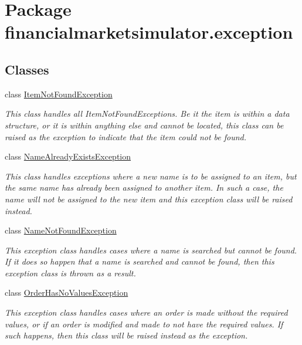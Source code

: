 \hypertarget{namespacefinancialmarketsimulator_1_1exception}{\section{Package financialmarketsimulator.\+exception}
\label{namespacefinancialmarketsimulator_1_1exception}
}
\subsection*{Classes}
\begin{DoxyCompactItemize}
\item 
class \hyperlink{classfinancialmarketsimulator_1_1exception_1_1_item_not_found_exception}{Item\+Not\+Found\+Exception}
\begin{DoxyCompactList}\small\item\em This class handles all Item\+Not\+Found\+Exceptions. Be it the item is within a data structure, or it is within anything else and cannot be located, this class can be raised as the exception to indicate that the item could not be found. \end{DoxyCompactList}\item 
class \hyperlink{classfinancialmarketsimulator_1_1exception_1_1_name_already_exists_exception}{Name\+Already\+Exists\+Exception}
\begin{DoxyCompactList}\small\item\em This class handles exceptions where a new name is to be assigned to an item, but the same name has already been assigned to another item. In such a case, the name will not be assigned to the new item and this exception class will be raised instead. \end{DoxyCompactList}\item 
class \hyperlink{classfinancialmarketsimulator_1_1exception_1_1_name_not_found_exception}{Name\+Not\+Found\+Exception}
\begin{DoxyCompactList}\small\item\em This exception class handles cases where a name is searched but cannot be found. If it does so happen that a name is searched and cannot be found, then this exception class is thrown as a result. \end{DoxyCompactList}\item 
class \hyperlink{classfinancialmarketsimulator_1_1exception_1_1_order_has_no_values_exception}{Order\+Has\+No\+Values\+Exception}
\begin{DoxyCompactList}\small\item\em This exception class handles cases where an order is made without the required values, or if an order is modified and made to not have the required values. If such happens, then this class will be raised instead as the exception. \end{DoxyCompactList}\end{DoxyCompactItemize}
